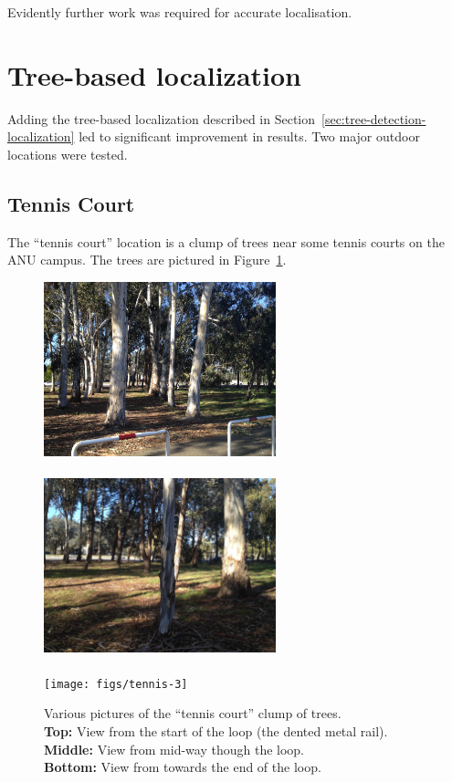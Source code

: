 \documentclass[12pt,oneside,a4paper]{book}
\begin{document}
Evidently further work was required for accurate localisation.
\newpage~\newpage
\section{Tree-based localization}
\label{sec:tree-based-local}

Adding the tree-based localization described in
Section~\ref{sec:tree-detection-localization} led to significant
improvement in results. Two major outdoor locations were tested.

\subsection{Tennis Court}
\label{sec:tennis-court}

The ``tennis court'' location is a clump of trees near some tennis
courts on the ANU campus. The trees are pictured in
Figure~\ref{fig:tennis-trees}.

\begin{figure}
  \centering
  \includegraphics[width=0.6\textwidth]{figs/tennis-1}\\
  ~\\
  \includegraphics[width=0.6\textwidth]{figs/tennis-2}\\
  ~\\
  \texttt{[image: figs/tennis-3]}\\
  \caption{Various pictures of the ``tennis court'' clump of trees.\\
  \textbf{Top:} View from the start of the loop (the dented metal
  rail).\\
  \textbf{Middle:} View from mid-way though the loop.\\
  \textbf{Bottom:} View from towards the end of the loop.}
  \label{fig:tennis-trees}
\end{figure}
\end{document}
